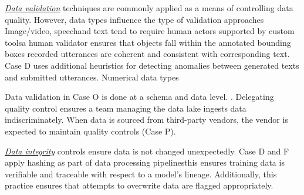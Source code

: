 \underline{\emph{Data validation}}%
techniques are commonly applied as a means of controlling data quality. However, data types influence the type of validation approaches \DIFdelbegin {}\DIFdelend \DIFaddbegin {}\DIFaddend Image/video, speech\DIFaddbegin \DIFadd{, }\DIFaddend and text tend to require human actors supported by custom tools\DIFdelbegin {}\DIFdelend \DIFaddbegin {}\DIFaddend a human validator ensures that objects fall within the annotated bounding boxes \DIFdelbegin {}\DIFdelend \DIFaddbegin {}\DIFaddend recorded utterances are coherent and consistent with corresponding text. Case D uses additional heuristics for detecting anomalies between generated texts and submitted utterances. Numerical data types \DIFdelbegin {}\DIFdelend \DIFaddbegin {}\DIFaddend 

Data validation in Case O is done at a schema and data level. \DIFdelbegin {}\textit{} %
\DIFdelend \DIFaddbegin {}\DIFaddend . Delegating quality control ensures a team managing the data lake ingests data indiscriminately. When data is sourced from third-party vendors, the vendor is expected to maintain quality controls (Case P).


\underline{\emph{Data integrity}}
controls ensure data is not changed unexpectedly. Case D and F apply hashing as part of data processing pipelines\DIFaddbegin \DIFadd{; }\DIFaddend this ensures training data is verifiable and traceable with respect to a model's lineage. Additionally, this practice ensures that attempts to overwrite data are flagged appropriately.

